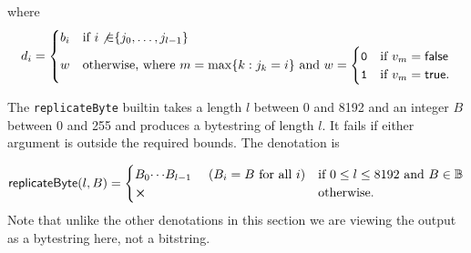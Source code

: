 \noindent where
$$
  d_i =
  \begin{cases}
    b_i & \text{if $i \not{\in} \{j_0, \ldots, j_{l-1}\}$}\\
    w & \text{otherwise, where $m = \max\{k : j_k = i\}$ and }
      w=\begin{cases}
      \mathtt{0} & \text{if $v_m = \mathsf{false}$}\\
      \mathtt{1} & \text{if $v_m = \mathsf{true}$}.
    \end{cases}
  \end{cases}
$$


\label{note:replicateByte}
The \texttt{replicateByte} builtin takes a length $l$ between 0 and 8192 and an
integer $B$ between 0 and 255 and produces a bytestring of length $l$.  It fails
if either argument is outside the required bounds.  The denotation is

$$
\mathsf{replicateByte}(l,B) =
\begin{cases}
B_0{\cdots}B_{l-1} \quad\text{ ($B_i=B$ for all $i$}) & \text{if $0 \leq l \leq 8192$ and $B \in \B$}\\
\errorX      & \text{otherwise}.
\end{cases}
$$
\noindent Note that unlike the other denotations in this section we are
viewing the output as a bytestring here, not a bitstring.
